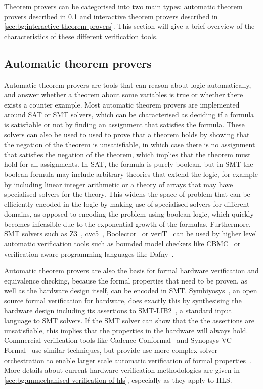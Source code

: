 Theorem provers can be categorised into two main types: automatic theorem
provers described in \cref{sec:bg:automatic-theorem-provers} and interactive
theorem provers described in \cref{sec:bg:interactive-theorem-provers}.  This
section will give a brief overview of the characteristics of these different
verification tools.

\subsection{Automatic theorem provers}%
\label{sec:bg:automatic-theorem-provers}

Automatic theorem provers are tools that can reason about logic automatically,
and answer whether a theorem about some variables is true or whether there
exists a counter example.  Most automatic theorem provers are implemented around
\gls{SAT} or \gls{SMT} solvers, which can be characterised as deciding if a
formula is satisfiable or not by finding an assignment that satisfies the
formula.  These solvers can also be used to used to prove that a theorem holds
by showing that the negation of the theorem is unsatisfiable, in which case
there is no assignment that satisfies the negation of the theorem, which implies
that the theorem must hold for all assignments.  In \gls{SAT}, the formula is
purely boolean, but in \gls{SMT} the boolean formula may include arbitrary
theories that extend the logic, for example by including linear integer
arithmetic or a theory of arrays that may have specialised solvers for the
theory.  This widens the space of problem that can be efficiently encoded in the
logic by making use of specialised solvers for different domains, as opposed to
encoding the problem using boolean logic, which quickly becomes infeasible due
to the exponential growth of the formulas.  Furthermore, \gls{SMT} solvers such
as Z3~\cite[]{moura08_z}, cvc5~\cite[]{barbosa22_cvc5},
Boolector~\cite[]{brummayer09_b} or veriT~\cite{bouton09} can be used by higher
level automatic verification tools such as bounded model checkers like
CBMC~\cite[]{kroening14_c} or verification aware programming languages like
Dafny~\cite[]{leino10_d}.

Automatic theorem provers are also the basis for formal hardware verification
and equivalence checking, because the formal properties that need to be proven,
as well as the hardware design itself, can be encoded in \gls{SMT}.
Symbiyosys~\cite{yosyshq23_symbiyosys}, an open source formal verification for
hardware, does exactly this by synthesising the hardware design including its
assertions to SMT-LIB2~\cite{barrett17_sls}, a standard input language to
\gls{SMT} solvers.  If the \gls{SMT} solver can show that the the assertions are
unsatisfiable, this implies that the properties in the hardware will always
hold.  Commercial verification tools like Cadence Conformal~\cite[]{cadence23_c}
and Synopsys VC Formal~\cite[]{synopsys23_v} use similar techniques, but provide
use more complex solver orchestration to enable larger scale automatic
verification of formal properties~\cite{koelbl09_sr}.  More details about
current hardware verification methodologies are given in
\cref{sec:bg:unmechanised-verification-of-hls}, especially as they apply to
\gls{HLS}.


